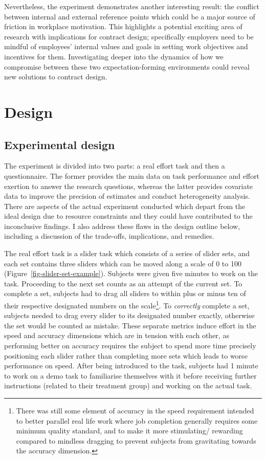 \documentclass[12pt, letterpaper, DIV=11, numbers=noendperiod]{article}
\begin{document}
Nevertheless, the experiment demonstrates another interesting result: the conflict between internal and external reference points which could be a major source of friction in workplace motivation. This highlights a potential exciting area of research with implications for contract design; specifically employers need to be mindful of employees' internal values and goals in setting work objectives and incentives for them. Investigating deeper into the dynamics of how we compromise between these two expectation-forming environments could reveal new solutions to contract design.

\section{Design}\label{design}

\subsection{Experimental design}\label{experimental-design}

The experiment is divided into two parts: a real effort task and then a questionnaire. The former provides the main data on task performance and effort exertion to answer the research questions, whereas the latter provides covariate data to improve the precision of estimates and conduct heterogeneity analysis. There are aspects of the actual experiment conducted which depart from the ideal design due to resource constraints and they could have contributed to the inconclusive findings. I also address these flaws in the design outline below, including a discussion of the trade-offs, implications, and remedies.

The real effort task is a slider task which consists of a series of slider sets, and each set contains three sliders which can be moved along a scale of 0 to 100 (Figure~\ref{fig-slider-set-example}). Subjects were given five minutes to work on the task. Proceeding to the next set counts as an attempt of the current set. To complete a set, subjects had to drag all sliders to within plus or minus ten of their respective designated numbers on the scale\footnote{There was still some element of accuracy in the speed requirement intended to better parallel real life work where job completion generally requires some minimum quality standard, and to make it more stimulating/ rewarding compared to mindless dragging to prevent subjects from gravitating towards the accuracy dimension.}. To \emph{correctly} complete a set, subjects needed to drag every slider to its designated number exactly, otherwise the set would be counted as mistake. These separate metrics induce effort in the speed and accuracy dimensions which are in tension with each other, as performing better on accuracy requires the subject to spend more time precisely positioning each slider rather than completing more sets which leads to worse performance on speed. After being introduced to the task, subjects had 1 minute to work on a demo task to familiarise themselves with it before receiving further instructions (related to their treatment group) and working on the actual task.
\end{document}

